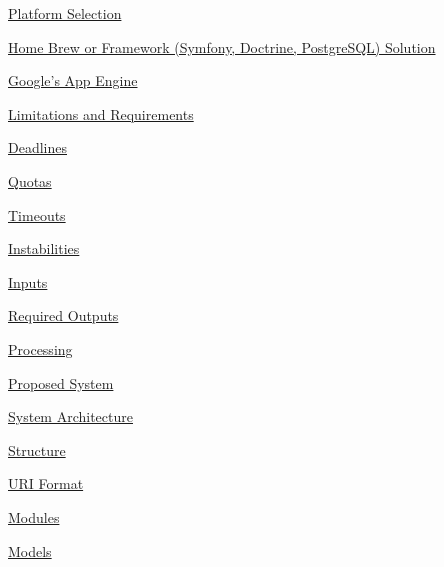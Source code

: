 \documentclass[10pt,a4paper,english]{article}
\begin{document}
\begin{list}{}{}
\begin{list}{}{}
\begin{list}{}{}
\end{list}

\item {} \href{\#platform-selection}{Platform Selection}
\begin{list}{}{}
\item {} \href{\#home-brew-or-framework-symfony-doctrine-postgresql-solution}{Home Brew or Framework (Symfony, Doctrine, PostgreSQL) Solution}

\item {} \href{\#google-s-app-engine}{Google's App Engine}
\begin{list}{}{}
\item {} \href{\#limitations-and-requirements}{Limitations and Requirements}
\begin{list}{}{}
\item {} \href{\#deadlines}{Deadlines}

\item {} \href{\#quotas}{Quotas}

\item {} \href{\#timeouts}{Timeouts}

\item {} \href{\#instabilities}{Instabilities}

\end{list}

\end{list}

\end{list}

\item {} \href{\#inputs}{Inputs}

\item {} \href{\#required-outputs}{Required Outputs}

\item {} \href{\#processing}{Processing}

\item {} \href{\#proposed-system}{Proposed System}

\end{list}

\item {} \href{\#system-architecture}{System Architecture}
\begin{list}{}{}
\item {} \href{\#structure}{Structure}
\begin{list}{}{}
\item {} \href{\#uri-format}{URI Format}

\item {} \href{\#modules}{Modules}
\begin{list}{}{}
\item {} \href{\#models}{Models}


\end{list}
\end{list}
\end{list}
\end{list}
\end{document}
